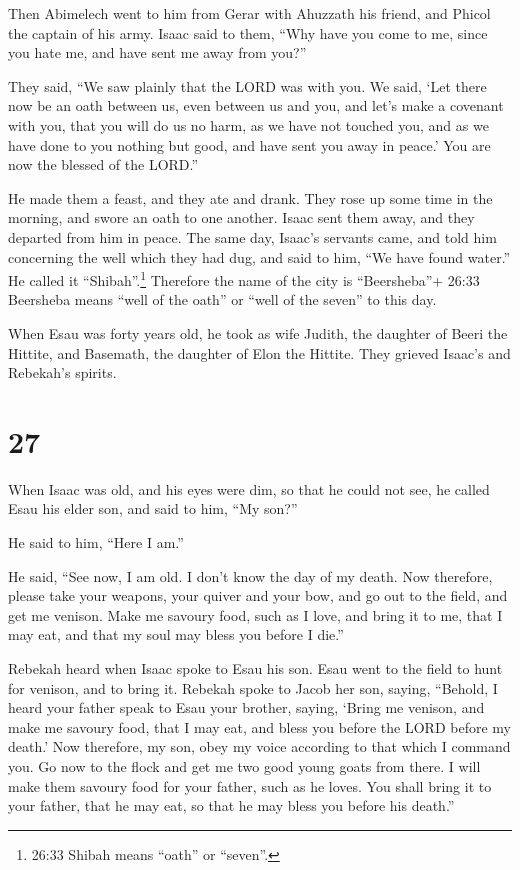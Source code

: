  Then Abimelech went to him from Gerar with Ahuzzath his
friend, and Phicol the captain of his army.  Isaac said to
them, ``Why have you come to me, since you hate me, and have sent me
away from you?''

 They said, ``We saw plainly that the LORD was with you. We
said, `Let there now be an oath between us, even between us and you, and
let's make a covenant with you,  that you will do us no
harm, as we have not touched you, and as we have done to you nothing but
good, and have sent you away in peace.' You are now the blessed of the
LORD.''

 He made them a feast, and they ate and drank.
 They rose up some time in the morning, and swore an oath
to one another. Isaac sent them away, and they departed from him in
peace.  The same day, Isaac's servants came, and told him
concerning the well which they had dug, and said to him, ``We have found
water.''  He called it ``Shibah''.\footnote{26:33 Shibah
  means ``oath'' or ``seven''.} Therefore the name of the city is
``Beersheba''+ 26:33 Beersheba means ``well of the oath'' or ``well of
the seven'' to this day.

 When Esau was forty years old, he took as wife Judith, the
daughter of Beeri the Hittite, and Basemath, the daughter of Elon the
Hittite.  They grieved Isaac's and Rebekah's spirits.

\hypertarget{section-26}{%
\section{27}\label{section-26}}

 When Isaac was old, and his eyes were dim, so that he could
not see, he called Esau his elder son, and said to him, ``My son?''

He said to him, ``Here I am.''

 He said, ``See now, I am old. I don't know the day of my
death.  Now therefore, please take your weapons, your quiver
and your bow, and go out to the field, and get me venison. 
Make me savoury food, such as I love, and bring it to me, that I may
eat, and that my soul may bless you before I die.''

 Rebekah heard when Isaac spoke to Esau his son. Esau went
to the field to hunt for venison, and to bring it.  Rebekah
spoke to Jacob her son, saying, ``Behold, I heard your father speak to
Esau your brother, saying,  `Bring me venison, and make me
savoury food, that I may eat, and bless you before the LORD before my
death.'  Now therefore, my son, obey my voice according to
that which I command you.  Go now to the flock and get me
two good young goats from there. I will make them savoury food for your
father, such as he loves.  You shall bring it to your
father, that he may eat, so that he may bless you before his death.''

